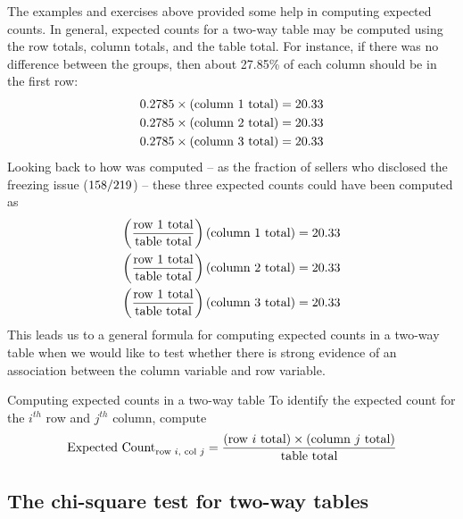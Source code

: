 The examples and exercises above provided some help
in computing expected counts.
In general, expected counts for a two-way table may
be computed using the row totals, column totals,
and the table total.
For instance, if there was no difference between the groups,
then about 27.85\% of each column should be in the first row:
\begin{align*}
0.2785{}\times (\text{column 1 total}) &= 20.33{} \\
0.2785{}\times (\text{column 2 total}) &= 20.33{} \\
0.2785{}\times (\text{column 3 total}) &= 20.33{}
\end{align*}
Looking back to how \iPodAFraction{} was computed --
as the fraction of sellers who disclosed the freezing issue
($158{}/219{}$) --
these three expected counts could have been computed as
\begin{align*}
\left(\frac{\text{row 1 total}}{\text{table total}}\right)
    \text{(column 1 total)} &= 20.33{} \\
\left(\frac{\text{row 1 total}}{\text{table total}}\right)
    \text{(column 2 total)} &= 20.33{} \\
\left(\frac{\text{row 1 total}}{\text{table total}}\right)
    \text{(column 3 total)} &= 20.33{}
\end{align*}
This leads us to a general formula for computing expected
counts in a two-way table when we would like to test whether
there is strong evidence of an association between the column
variable and row variable.

\D{\newpage}

\begin{onebox}{Computing expected counts in a two-way table}
  To identify the expected count for the $i^{th}$ row
  and $j^{th}$ column, compute
  \begin{align*}
  \text{Expected Count}_{\text{row }i,\text{ col }j}
    = \frac{(\text{row $i$ total}) \times
        (\text{column $j$ total})}{\text{table total}}\vspace{2mm}
  \end{align*}
\end{onebox}


\subsection{The chi-square test for two-way tables}


